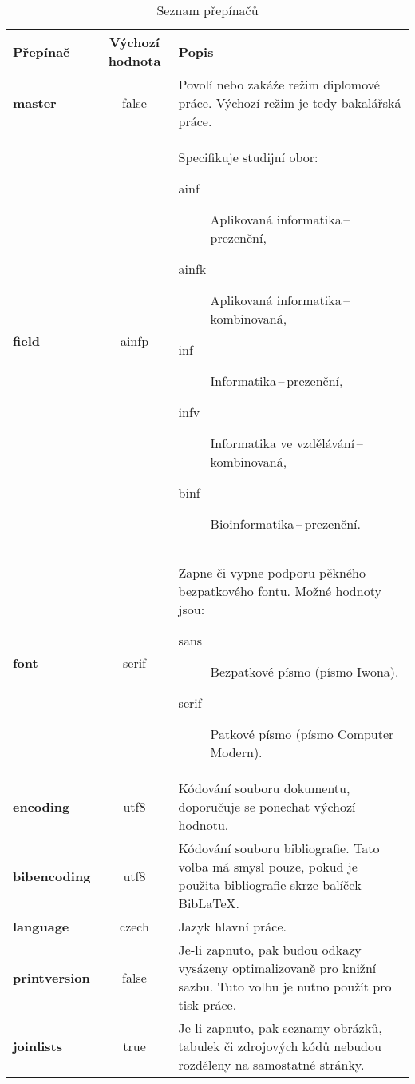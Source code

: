 \documentclass[
  master=false,               %
  font=sans,                  %
  printversion=false,         %
  joinlists=true,             %
  glossaries=true,            %
  figures=true,               %
  tables=true,                %
  sourcecodes=true,					  %
  theorems=true,						  %
  bibencoding=utf8,           %
  language=czech,             %
  encoding=utf8,              %
  field=inf,                  %
  index=true,                 %
]{updiplom}
\begin{document}
\begin{table}
\begin{center}
\caption{Seznam přepínačů}\label{tab:prepinace}
\begin{tabular}{>{\bfseries}l >{\ttfamily}c L{8cm}}
{\normalfont Přepínač} & {\normalfont Výchozí hodnota} & {\normalfont Popis} \\
\hline
master & false & Povolí nebo zakáže režim diplomové práce. Výchozí režim je tedy bakalářská práce. \\

field & ainfp & Specifikuje studijní obor:\newline
\begin{description}
\item[ainf] Aplikovaná informatika\,--\,prezenční,
\item[ainfk] Aplikovaná informatika\,--\,kombinovaná,
\item[inf] Informatika\,--\,prezenční,
\item[infv] Informatika ve vzdělávání\,--\,kombinovaná,
\item[binf] Bioinformatika\,--\,prezenční.
\end{description} \\

font & serif & Zapne či vypne podporu pěkného bezpatkového fontu. Možné hodnoty jsou:\newline
\begin{description}
\item[sans] Bezpatkové písmo (písmo Iwona).
\item[serif] Patkové písmo (písmo Computer Modern).
\end{description} \\

encoding & utf8 & Kódování souboru dokumentu, doporučuje se ponechat výchozí hodnotu. \\

bibencoding & utf8 & Kódování souboru bibliografie. Tato volba má smysl pouze, pokud je použita bibliografie skrze balíček Bib\LaTeX{}. \\

language & czech & Jazyk hlavní práce. \\

printversion & false & Je-li zapnuto, pak budou odkazy vysázeny optimalizovaně pro knižní sazbu. Tuto volbu je nutno použít pro tisk práce. \\

joinlists & true & Je-li zapnuto, pak seznamy obrázků, tabulek či zdrojových kódů nebudou rozděleny na samostatné stránky. \\


\end{tabular}
\end{center}
\end{table}
\end{document}

